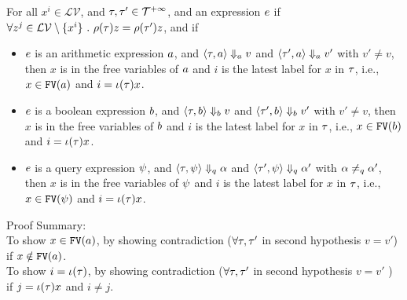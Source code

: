 \begin{lem}
	\label{lem:inv_expr}
	For all {$ x^i \in \mathcal{LV}$, and $\mathtt{\tau}, \mathtt{\tau}' \in \mathcal{T}^{+\infty}$, and an expression $e$} if
	$ \forall z^j \in \mathcal{LV}  \setminus \{x^i\} ~.~  
	\rho(\mathtt{\tau}) z = \rho(\mathtt{\tau}') z $, and if
	\begin{itemize}
		\item $e$ is an arithmetic expression $a$,
		and $\langle \mathtt{\tau}, a \rangle \Downarrow_a v $ and 
	$\langle \mathtt{\tau}', a \rangle \Downarrow_a v' $ with $v' \neq v$, 
	then $ x $ is in the free variables of $a$ and $i$ is the latest label for $x$ 
    in $\mathtt{\tau}$, i.e., $x \in \mathtt{FV}(a)$ and $i = \iota(\mathtt{\tau}) x$.
%
	\item $e$ is a boolean expression $b$,
  and $\langle \mathtt{\tau}, b \rangle \Downarrow_b v $ and 
 $\langle \mathtt{\tau}', b \rangle \Downarrow_b v' $ with $v' \neq v$, then $ x $ is in the free variables of $b$ and $i$ is the latest label for $x$ 
 in $\mathtt{\tau}$, i.e., $x \in \mathtt{FV}(b)$ and $i = \iota(\mathtt{\tau}) x$.
% 
	\item $e$ is a query expression $\psi$,
	and $\langle \mathtt{\tau}, \psi \rangle \Downarrow_q \alpha $ and 
	$\langle \mathtt{\tau}', \psi \rangle \Downarrow_q \alpha' $ with $\alpha \neq_{q} \alpha'$, then $ x $ is in the free variables of $\psi$ and $i$ is the latest label for $x$ 
    in $\mathtt{\tau}$, i.e., $x \in \mathtt{FV}(\psi)$ and $i = \iota(\mathtt{\tau}) x$.
\end{itemize}	%
	\end{lem}
    Proof Summary:
    \\
    To show $x \in \mathtt{FV}(a)$, by showing contradiction ($\forall \mathtt{\tau}, \mathtt{\tau}'$ in second hypothesis  $v = v'$)
     if $x \notin \mathtt{FV}(a)$.
     \\
    To show $i = \iota(\mathtt{\tau})$, by showing contradiction ($\forall \mathtt{\tau}, \mathtt{\tau}'$ in second hypothesis  $v = v'$ ) 
    if $j = \iota(\mathtt{\tau}) x$ and $i \neq j$.
